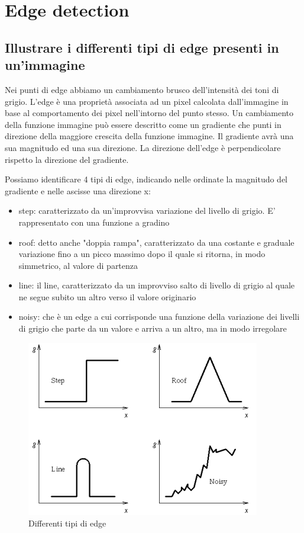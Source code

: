 \chapter{Edge detection}

\section{Illustrare i differenti tipi di edge presenti in un'immagine}
Nei punti di edge abbiamo un cambiamento brusco dell'intensità dei toni di grigio. L'edge è una proprietà associata ad un pixel calcolata dall'immagine in base al comportamento dei pixel nell'intorno del punto stesso. Un cambiamento della funzione immagine può essere descritto come un gradiente che punti in direzione della maggiore crescita della funzione immagine. Il gradiente avrà una sua magnitudo ed una sua direzione. La direzione dell'edge è perpendicolare rispetto la direzione del gradiente.

Possiamo identificare 4 tipi di edge, indicando nelle ordinate la magnitudo del gradiente e nelle ascisse una direzione x:
\begin{itemize}
	\item step: caratterizzato da un'improvvisa variazione del livello di grigio. E' rappresentato con una funzione a gradino
	\item roof: detto anche "doppia rampa", caratterizzato da una costante e graduale variazione fino a un	picco massimo dopo il quale si ritorna, in modo simmetrico, al valore di partenza
	\item line: il line, caratterizzato da un improvviso salto di livello di grigio al quale ne segue subito un altro verso il valore originario
	\item noisy: che è un edge a cui corrisponde una funzione della variazione dei livelli di grigio che parte da un valore e arriva a un altro, ma in modo irregolare
\end{itemize}

\begin{figure}[htbp]
	\centering
	\includegraphics[scale=.5]{img/edge.png}
	\caption{Differenti tipi di edge}\label{fig:edge}
\end{figure}

